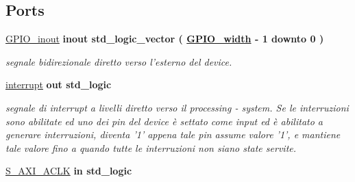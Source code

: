 \subsection*{Ports}
 \begin{DoxyCompactItemize}
\item 
\hypertarget{classmy_g_p_i_o___a_x_i_ga8829699d739ef35a4c5da396ffd38387}{\hyperlink{group___a_x_i-internal_ga8829699d739ef35a4c5da396ffd38387}{G\+P\+I\+O\+\_\+inout}  {\bfseries {\bfseries \textcolor{vhdlchar}{inout}\textcolor{vhdlchar}{ }}} {\bfseries \textcolor{vhdlchar}{std\+\_\+logic\+\_\+vector}\textcolor{vhdlchar}{ }\textcolor{vhdlchar}{(}\textcolor{vhdlchar}{ }\textcolor{vhdlchar}{ }\textcolor{vhdlchar}{ }\textcolor{vhdlchar}{ }{\bfseries \hyperlink{group___a_x_i-internal_ga0b52ca75e9a6093b2b60d5e851803069}{G\+P\+I\+O\+\_\+width}} \textcolor{vhdlchar}{-\/}\textcolor{vhdlchar}{ } \textcolor{vhdldigit}{1} \textcolor{vhdlchar}{ }\textcolor{vhdlchar}{downto}\textcolor{vhdlchar}{ }\textcolor{vhdlchar}{ } \textcolor{vhdldigit}{0} \textcolor{vhdlchar}{ }\textcolor{vhdlchar}{)}\textcolor{vhdlchar}{ }} }\label{classmy_g_p_i_o___a_x_i_ga8829699d739ef35a4c5da396ffd38387}

\begin{DoxyCompactList}\small\item\em segnale bidirezionale diretto verso l'esterno del device. \end{DoxyCompactList}\item 
\hypertarget{classmy_g_p_i_o___a_x_i_ga5b78f3e3edfaf6e8ec79031b9e631e9d}{\hyperlink{group___a_x_i-internal_ga5b78f3e3edfaf6e8ec79031b9e631e9d}{interrupt}  {\bfseries {\bfseries \textcolor{vhdlchar}{out}\textcolor{vhdlchar}{ }}} {\bfseries \textcolor{vhdlchar}{std\+\_\+logic}\textcolor{vhdlchar}{ }} }\label{classmy_g_p_i_o___a_x_i_ga5b78f3e3edfaf6e8ec79031b9e631e9d}

\begin{DoxyCompactList}\small\item\em segnale di interrupt a livelli diretto verso il processing -\/ system. Se le interruzioni sono abilitate ed uno dei pin del device è settato come input ed è abilitato a generare interruzioni, diventa '1' appena tale pin assume valore '1', e mantiene tale valore fino a quando tutte le interruzioni non siano state servite. \end{DoxyCompactList}\item 
\hypertarget{classmy_g_p_i_o___a_x_i_ga3f54d782a88290bdaa6baffd7cd84ab4}{\hyperlink{group___a_x_i-internal_ga3f54d782a88290bdaa6baffd7cd84ab4}{S\+\_\+\+A\+X\+I\+\_\+\+A\+C\+L\+K}  {\bfseries {\bfseries \textcolor{vhdlchar}{in}\textcolor{vhdlchar}{ }}} {\bfseries \textcolor{vhdlchar}{std\+\_\+logic}\textcolor{vhdlchar}{ }} }\label{classmy_g_p_i_o___a_x_i_ga3f54d782a88290bdaa6baffd7cd84ab4}


\end{DoxyCompactItemize}
